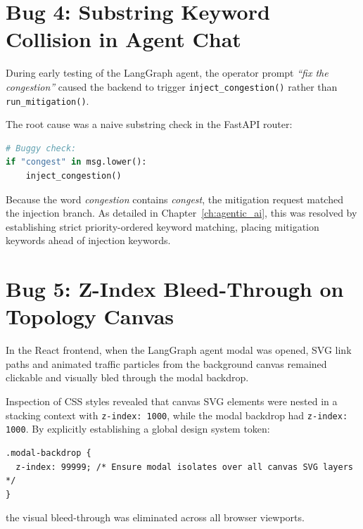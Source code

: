 \section{Bug 4: Substring Keyword Collision in Agent Chat}
During early testing of the LangGraph agent, the operator prompt \textit{``fix the congestion''} caused the backend to trigger \texttt{inject\_congestion()} rather than \texttt{run\_mitigation()}. 

The root cause was a naive substring check in the FastAPI router:
\begin{lstlisting}[language=Python]
# Buggy check:
if "congest" in msg.lower():
    inject_congestion()
\end{lstlisting}
Because the word \textit{congestion} contains \textit{congest}, the mitigation request matched the injection branch. As detailed in Chapter~\ref{ch:agentic_ai}, this was resolved by establishing strict priority-ordered keyword matching, placing mitigation keywords ahead of injection keywords.

\section{Bug 5: Z-Index Bleed-Through on Topology Canvas}
In the React frontend, when the LangGraph agent modal was opened, SVG link paths and animated traffic particles from the background canvas remained clickable and visually bled through the modal backdrop. 

Inspection of CSS styles revealed that canvas SVG elements were nested in a stacking context with \texttt{z-index: 1000}, while the modal backdrop had \texttt{z-index: 1000}. By explicitly establishing a global design system token:
\begin{lstlisting}
.modal-backdrop {
  z-index: 99999; /* Ensure modal isolates over all canvas SVG layers */
}
\end{lstlisting}
the visual bleed-through was eliminated across all browser viewports.
